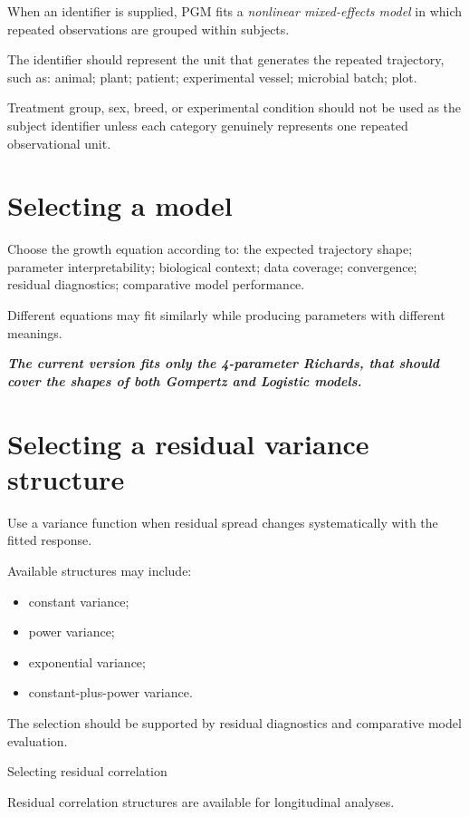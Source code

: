 \documentclass[
  english,
  letterpaper,
  DIV=11,
  numbers=noendperiod]{scrreprt}
\begin{document}
When an identifier is supplied, PGM fits a \emph{nonlinear mixed-effects
model} in which repeated observations are grouped within subjects.

The identifier should represent the unit that generates the repeated
trajectory, such as: animal; plant; patient; experimental vessel;
microbial batch; plot.

Treatment group, sex, breed, or experimental condition should not be
used as the subject identifier unless each category genuinely represents
one repeated observational unit.

\section{Selecting a model}\label{selecting-a-model}

Choose the growth equation according to: the expected trajectory shape;
parameter interpretability; biological context; data coverage;
convergence; residual diagnostics; comparative model performance.

Different equations may fit similarly while producing parameters with
different meanings.

\textbf{\emph{The current version fits only the 4-parameter Richards,
that should cover the shapes of both Gompertz and Logistic models.}}

\section{Selecting a residual variance
structure}\label{selecting-a-residual-variance-structure}

Use a variance function when residual spread changes systematically with
the fitted response.

Available structures may include:

\begin{itemize}
\item
  constant variance;
\item
  power variance;
\item
  exponential variance;
\item
  constant-plus-power variance.
\end{itemize}

The selection should be supported by residual diagnostics and
comparative model evaluation.

Selecting residual correlation

Residual correlation structures are available for longitudinal analyses.
\end{document}
